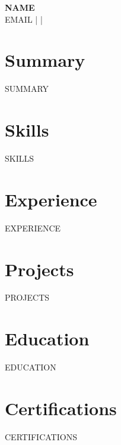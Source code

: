 \documentclass[11pt,a4paper]{article}
\begin{document}
{\LARGE \textbf{{{NAME}}}}\\
\vspace{2pt}
{{EMAIL}} \quad |  \quad | \\
\vspace{10pt}

\section*{Summary}
{{SUMMARY}}

\section*{Skills}
{{SKILLS}}

\section*{Experience}
{{EXPERIENCE}}

\section*{Projects}
{{PROJECTS}}

\section*{Education}
{{EDUCATION}}

\section*{Certifications}
{{CERTIFICATIONS}}
\end{document}
